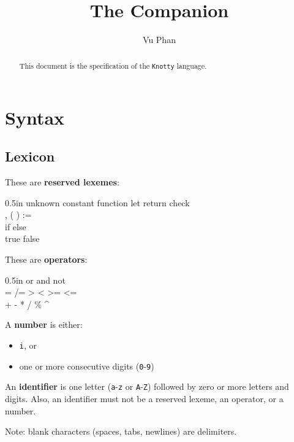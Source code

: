 \documentclass[letterpaper, 12pt]{extarticle}
\title{The \kn{} Companion}
\author{Vu Phan}
\theoremstyle{definition} %
\newcommand{\textdef}[1]{\textbf{#1}}
\newcommand{\code}[1]{\texttt{#1}}
\newcommand{\kn}{\code{Knotty}}
\newenvironment{codeblock}
    {\begin{addmargin}{0.5in} \ttfamily}
    {\end{addmargin}}
\begin{document}
\maketitle

\begin{abstract}
This document is the specification of the \kn{} language.
\end{abstract}


\thispagestyle{fancy}


\newpage

\section{Syntax}


\subsection{Lexicon}

These are \textdef{reserved lexemes}:
\begin{codeblock}
unknown constant function let return check \\
, ( ) := \\
if else \\
true false
\end{codeblock}

These are \textdef{operators}:
\begin{codeblock}
or and not \\
= /= > < >= <= \\
+ - * / \% \^{}
\end{codeblock}

A \textdef{number} is either:
\begin{itemize}
\item \code{i}, or
\item one or more consecutive digits (\code{0}-\code{9})
\end{itemize}

An \textdef{identifier} is one letter
(\code{a}-\code{z} or \code{A}-\code{Z})
followed by zero or more letters and digits.
Also, an identifier must not be a reserved lexeme,
an operator, or a number.

Note: blank characters (spaces, tabs, newlines)
are delimiters.
\end{document}
